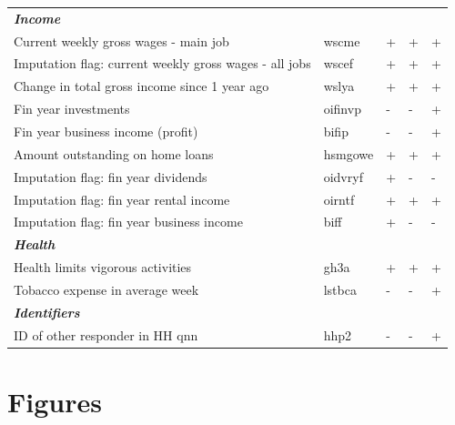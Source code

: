 \documentclass[12pt, a4paper]{article}
\begin{document}
\begin{longtable}{p{} C{0.1\textwidth} C{0.15\textwidth} C{0.15\textwidth} C{0.15\textwidth}}
\textbf{\textit{Income}} 	& 		 & 		 & 		 & 		\\
Current weekly gross wages - main job 	& 	wscme	 & 	+	 & 	+	 & 	+	\\
Imputation flag: current weekly gross wages - all jobs 	& 	wscef	 & 	+	 & 	+	 & 	+	\\
Change in total gross income since 1 year ago 	& 	wslya	 & 	+	 & 	+	 & 	+	\\
Fin year investments 	& 	oifinvp	 & 	-	 & 	-	 & 	+	\\
Fin year business income (profit) 	& 	bifip	 & 	-	 & 	-	 & 	+	\\
Amount outstanding on home loans 	& 	hsmgowe	 & 	+	 & 	+	 & 	+	\\
Imputation flag: fin year dividends 	& 	oidvryf	 & 	+	 & 	-	 & 	-	\\
Imputation flag: fin year rental income 	& 	oirntf	 & 	+	 & 	+	 & 	+	\\
Imputation flag: fin year business income 	& 	biff	 & 	+	 & 	-	 & 	-	\\
\textbf{\textit{Health}} 	& 		 & 		 & 		 & 		\\
Health limits vigorous activities 	& 	gh3a	 & 	+	 & 	+	 & 	+	\\
Tobacco expense in average week 	& 	lstbca	 & 	-	 & 	-	 & 	+	\\
\textbf{\textit{Identifiers}} 	& 		 & 		 & 		 & 		\\
ID of other responder in HH qnn 	& 	hhp2	 & 	-	 & 	-	 & 	+	
\label{tab:mlvars}
\end{longtable}  
      
\section{Figures}
\label{app:figures}
%
%
\end{document}
